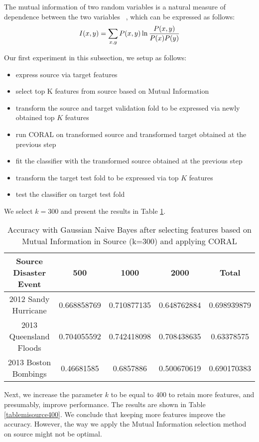 The mutual information of two random variables is a natural measure of dependence between the two variables ~\citep{hastie}, which can be expressed as follows: \[I(x,y) = \sum_{x,y} P(x,y) \ln {{P(x,y)}\over{P(x) P(y)}} \]

Our first experiment in this subsection, we setup as follows:
  \begin{itemize}
  \item express source via target features
  \item select top K features from source based on Mutual Information
  \item transform the source and target validation fold to be expressed via newly obtained top $K$ features 
  \item run CORAL on transformed source and transformed target obtained at the previous step
  \item fit the classifier with the transformed source obtained at the previous step
  \item transform the target test fold to be expressed via top $K$ features
  \item test the classifier on target test fold
  \end{itemize}

We select $k=300$ and present the results in Table \ref{tablemisource300}. 

\begin{table}[ht]
    \begin{center}
    \caption{Accuracy with Gaussian Naive Bayes after selecting features based on Mutual Information in Source (k=300) and applying CORAL}
    \begin{tabular}[c]{|c|c|c|c|c|}
        \hline
        Source Disaster Event & 500 & 1000 & 2000 & Total \\
        \hline
        2012 Sandy Hurricane & 0.668858769 & 0.710877135 & 0.648762884 & 0.698939879 \\
        2013 Queensland Floods & 0.704055592 & 0.742418098 & 0.708438635 & 0.63378575 \\
        2013 Boston Bombings & 0.46681585 & 0.6857886 & 0.500670619 & 0.690170383 \\
        \hline
    \end{tabular}
    \label{tablemisource300}
   \end{center}
\end{table}

Next, we increase the parameter $k$ to be equal to $400$ to retain more features, and presumably, improve performance.
The results are shown in Table \ref{tablemisource400}. We conclude that keeping more features improve the accuracy. However, the way we apply the Mutual Information selection method on source might not be optimal.

